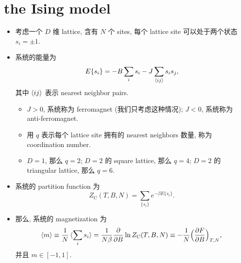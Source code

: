 \section{the Ising model}
\begin{itemize}
	\item 考虑一个 $D$ 维 lattice, 含有 $N$ 个 sites, 每个 lattice site 可以处于两个状态 $s_i = \pm 1$.
	
	\item 系统的能量为
	\begin{equation}
		E\{s_i\} = - B \sum_i s_i - J \sum_{\braket{i j}} s_i s_j,
	\end{equation}
	其中 $\braket{i j}$ 表示 nearest neighbor pairs.
	\begin{itemize}
		\item $J > 0$, 系统称为 ferromagnet (我们只考虑这种情况); $J < 0$, 系统称为 anti-ferromagnet.
		
		\item 用 $q$ 表示每个 lattice site 拥有的 nearest neighbors 数量, 称为 coordination number.
		
		\item $D = 1$, 那么 $q = 2$; $D = 2$ 的 square lattice, 那么 $q = 4$; $D = 2$ 的 triangular lattice, 那么 $q = 6$.
	\end{itemize}
	
	\item 系统的 partition function 为
	\begin{equation}
		Z_\text{C}(T, B, N) = \sum_{\{s_i\}} e^{- \beta E\{s_i\}}.
	\end{equation}
	
	\item 那么, 系统的 magnetization 为
	\begin{equation}
		\braket{m} \equiv \frac{1}{N} \braket{\sum_i s_i} = \frac{1}{N \beta} \frac{\partial}{\partial B} \ln Z_\text{C}(T, B, N) \equiv - \frac{1}{N} \Big( \frac{\partial F}{\partial B} \Big)_{T, N},
	\end{equation}
	并且 $m \in [- 1, 1]$.
	

\end{itemize}
